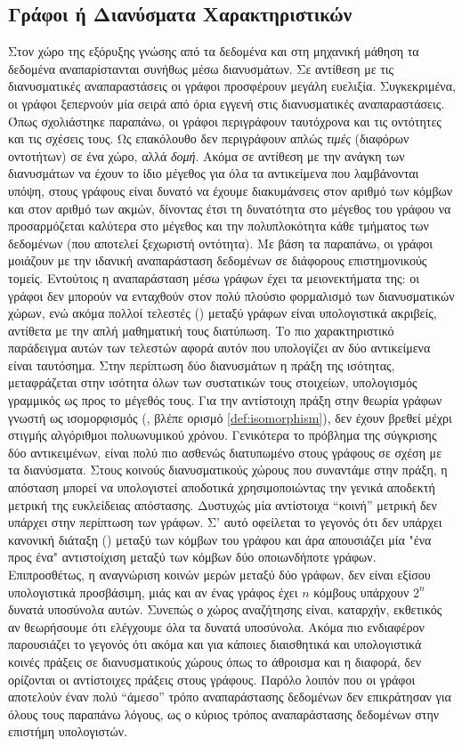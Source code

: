 \subsection{Γράφοι ή Διανύσματα Χαρακτηριστικών}
Στον χώρο της εξόρυξης γνώσης από τα δεδομένα και στη μηχανική μάθηση τα δεδομένα αναπαρίστανται συνήθως μέσω διανυσμάτων.
Σε αντίθεση με τις διανυσματικές αναπαραστάσεις οι γράφοι προσφέρουν μεγάλη ευελιξία.
Συγκεκριμένα, οι γράφοι ξεπερνούν μία σειρά από όρια εγγενή στις διανυσματικές αναπαραστάσεις.
Όπως σχολιάστηκε παραπάνω, οι γράφοι περιγράφουν ταυτόχρονα και τις οντότητες και τις σχέσεις τους.
Ως επακόλουθο δεν περιγράφουν απλώς \textit{τιμές} (διαφόρων οντοτήτων) σε ένα χώρο, αλλά \textit{δομή}.
Ακόμα σε αντίθεση με την ανάγκη των διανυσμάτων να έχουν το ίδιο μέγεθος για όλα τα αντικείμενα που λαμβάνονται υπόψη, στους γράφους είναι δυνατό να έχουμε διακυμάνσεις στον αριθμό των κόμβων και στον αριθμό των ακμών, δίνοντας έτσι τη δυνατότητα στο μέγεθος του γράφου να προσαρμόζεται καλύτερα στο μέγεθος και την πολυπλοκότητα κάθε τμήματος των δεδομένων (που αποτελεί ξεχωριστή οντότητα).
Με βάση τα παραπάνω, οι γράφοι μοιάζουν με την ιδανική αναπαράσταση δεδομένων σε διάφορους επιστημονικούς τομείς.
Εντούτοις η αναπαράσταση μέσω γράφων έχει τα μειονεκτήματα της: οι γράφοι δεν μπορούν να ενταχθούν στον πολύ πλούσιο φορμαλισμό των διανυσματικών χώρων, ενώ ακόμα πολλοί τελεστές () μεταξύ γράφων είναι υπολογιστικά ακριβείς, αντίθετα με την απλή μαθηματική τους διατύπωση.
Το πιο χαρακτηριστικό παράδειγμα αυτών των τελεστών αφορά αυτόν που υπολογίζει αν δύο αντικείμενα είναι ταυτόσημα.
Στην περίπτωση δύο διανυσμάτων η πράξη της ισότητας, μεταφράζεται στην ισότητα όλων των συστατικών τους στοιχείων, υπολογισμός γραμμικός ως προς το μέγεθός τους.
Για την αντίστοιχη πράξη στην θεωρία γράφων γνωστή ως ισομορφισμός (, βλέπε ορισμό \ref{def:isomorphism}), δεν έχουν βρεθεί μέχρι στιγμής αλγόριθμοι πολυωνυμικού χρόνου.
Γενικότερα το πρόβλημα της σύγκρισης δύο αντικειμένων, είναι πολύ πιο ασθενώς διατυπωμένο στους γράφους σε σχέση με τα διανύσματα.
Στους κοινούς διανυσματικούς χώρους που συναντάμε στην πράξη, η απόσταση μπορεί να υπολογιστεί αποδοτικά χρησιμοποιώντας την γενικά αποδεκτή μετρική της ευκλείδειας απόστασης.
Δυστυχώς μία αντίστοιχα ``κοινή'' μετρική δεν υπάρχει στην περίπτωση των γράφων.
Σ' αυτό οφείλεται το γεγονός ότι δεν υπάρχει κανονική διάταξη () μεταξύ των κόμβων του γράφου και άρα απουσιάζει μία "ένα προς ένα" αντιστοίχιση μεταξύ των κόμβων δύο οποιωνδήποτε γράφων.
Επιπροσθέτως, η αναγνώριση κοινών μερών μεταξύ δύο γράφων, δεν είναι εξίσου υπολογιστικά προσβάσιμη, μιάς και αν ένας γράφος έχει $n$ κόμβους υπάρχουν $2^{n}$ δυνατά υποσύνολα αυτών.
Συνεπώς ο χώρος αναζήτησης είναι, καταρχήν, εκθετικός αν θεωρήσουμε ότι ελέγχουμε όλα τα δυνατά υποσύνολα.
Ακόμα πιο ενδιαφέρον παρουσιάζει το γεγονός ότι ακόμα και για κάποιες διαισθητικά και υπολογιστικά κοινές πράξεις σε διανυσματικούς χώρους όπως το άθροισμα και η διαφορά, δεν ορίζονται οι αντίστοιχες πράξεις στους γράφους.
Παρόλο λοιπόν που οι γράφοι αποτελούν έναν πολύ ``άμεσο'' τρόπο αναπαράστασης δεδομένων δεν επικράτησαν για όλους τους παραπάνω λόγους, ως ο κύριος τρόπος αναπαράστασης δεδομένων στην επιστήμη υπολογιστών.
